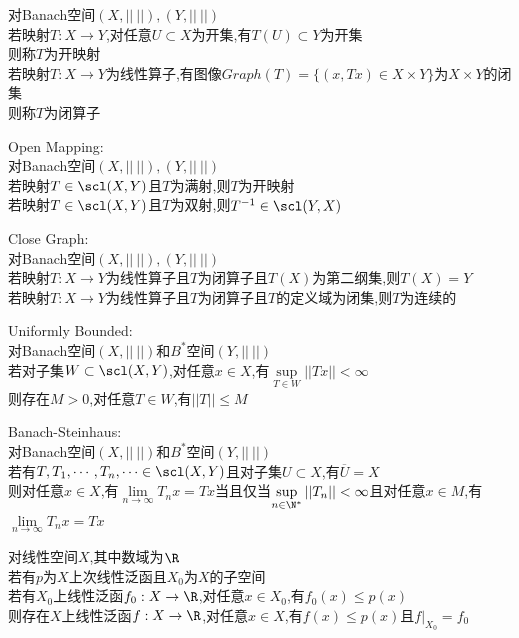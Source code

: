 \begin{dingyi}
对Banach空间$(X,||\ ||),(Y,||\ ||)$\\
若映射$T:X\to Y$,对任意$U\subset X$为开集,有$T(U)\subset Y$为开集\\
则称$T$为开映射\\
若映射$T:X\to Y$为线性算子,有图像$Graph(T)=\{(x,Tx)\in X\times Y\}$为$X\times Y$的闭集\\
则称$T$为闭算子
\end{dingyi}

\begin{dingli}
Open Mapping:\\
对Banach空间$(X,||\ ||),(Y,||\ ||)$\\
若映射$T\in \scl(X,Y)$且$T$为满射,则$T$为开映射\\
若映射$T\in \scl(X,Y)$且$T$为双射,则$T^{-1}\in \scl(Y,X)$
\end{dingli}

\begin{dingli}
Close Graph:\\
对Banach空间$(X,||\ ||),(Y,||\ ||)$\\
若映射$T:X\to Y$为线性算子且$T$为闭算子且$T(X)$为第二纲集,则$T(X)=Y$\\
若映射$T:X\to Y$为线性算子且$T$为闭算子且$T$的定义域为闭集,则$T$为连续的
\end{dingli}

\begin{dingli}
Uniformly Bounded:\\
对Banach空间$(X,||\ ||)$和$B^*$空间$(Y,||\ ||)$\\
若对子集$W\subset \scl(X,Y)$,对任意$x\in X$,有$\sup\limits_{T\in W}||Tx||<\infty$\\
则存在$M>0$,对任意$T\in W$,有$||T||\leq M$
\end{dingli}

\begin{dingli}
Banach-Steinhaus:\\
对Banach空间$(X,||\ ||)$和$B^*$空间$(Y,||\ ||)$\\
若有$T,T_{1},\cdots,T_{n},\cdots\in \scl(X,Y)$且对子集$U\subset X$,有$\overline{U}=X$\\
则对任意$x\in X$,有$\lim\limits_{n\to\infty}T_{n}x=Tx$当且仅当$\sup\limits_{n\in \N^*}||T_{n}||<\infty$且对任意$x\in M$,有$\lim\limits_{n\to\infty}T_{n}x=Tx$
\end{dingli}

\begin{dingli}
对线性空间$X$,其中数域为$\R$\\
若有$p$为$X$上次线性泛函且$X_0$为$X$的子空间\\
若有$X_0$上线性泛函$f_0:X\to \R$,对任意$x\in X_0$,有$f_0(x)\leq p(x)$\\
则存在$X$上线性泛函$f:X\to \R$,对任意$x\in X$,有$f(x)\leq p(x)$且$f|_{X_0}=f_{0}$
\end{dingli}

